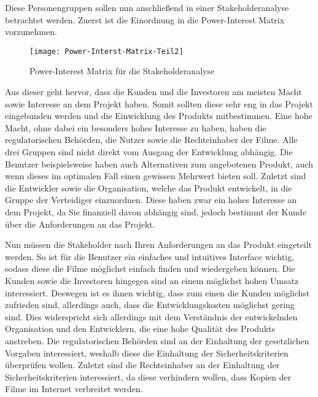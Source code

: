 Diese Personengruppen sollen nun anschließend in einer Stakeholderanalyse betrachtet werden.
Zuerst ist die Einordnung in die Power-Interest Matrix vorzunehmen.
\begin{figure}[ht]
    \centering
    \texttt{[image: Power-Interst-Matrix-Teil2]}
    \caption{Power-Interest Matrix für die Stakeholderanalyse}
    \label{fig:power-interest-matrix2}
\end{figure}

Aus dieser geht hervor, dass die Kunden und die Investoren am meisten Macht sowie Interesse an dem Projekt haben.
Somit sollten diese sehr eng in das Projekt eingebunden werden und die Einwicklung des Produkts mitbestimmen.
Eine hohe Macht, ohne dabei ein besonders hohes Interesse zu haben, haben die regulatorischen Behörden, die Nutzer sowie die Rechteinhaber der Filme.
Alle drei Gruppen sind nicht direkt vom Ausgang der Entwicklung abhängig.
Die Benutzer beispielsweise haben auch Alternativen zum angebotenen Produkt, auch wenn dieses im optimalen Fall einen gewissen Mehrwert bieten soll.
Zuletzt sind die Entwickler sowie die Organisation, welche das Produkt entwickelt, in die Gruppe der Verteidiger einzuordnen.
Diese haben zwar ein hohes Interesse an dem Projekt, da Sie finanziell davon abhängig sind, jedoch bestimmt der Kunde über die Anforderungen an das Projekt.


Nun müssen die Stakeholder nach Ihren Anforderungen an das Produkt eingeteilt werden.
So ist für die Benutzer ein einfaches und intuitives Interface wichtig, sodass diese die Filme möglichst einfach finden und wiedergeben können.
Die Kunden sowie die Investoren hingegen sind an einem möglichst hohen Umsatz interessiert.
Deswegen ist es ihnen wichtig, dass zum einen die Kunden möglichst zufrieden sind, allerdings auch, dass die Entwicklungskosten möglichst gering sind.
Dies widerspricht sich allerdings mit dem Verständnis der entwickelnden Organisation und den Entwicklern, die eine hohe Qualität des Produkts anstreben.
Die regulatorischen Behörden sind an der Einhaltung der gesetzlichen Vorgaben interessiert, weshalb diese die Einhaltung der Sicherheitskriterien überprüfen wollen.
Zuletzt sind die Rechteinhaber an der Einhaltung der Sicherheitskriterien interessiert, da diese verhindern wollen, dass Kopien der Filme im Internet verbreitet werden.
